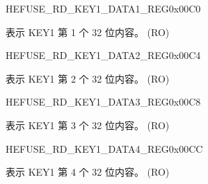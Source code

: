 \begin{register}{H}{EFUSE\_RD\_KEY1\_DATA1\_REG}{0x{}00C0}\label{regdesc:EFUSERDKEY1DATA1REG}
%
\regnewline%
\begin{regdesc}\begin{reglist}
\label{fielddesc:EFUSEKEY1DATA1}\item [EFUSE\_KEY1\_DATA1] 表示 KEY1 第 1 个 32 位内容。 (RO)
\end{reglist}\end{regdesc}
\end{register}


\begin{register}{H}{EFUSE\_RD\_KEY1\_DATA2\_REG}{0x{}00C4}\label{regdesc:EFUSERDKEY1DATA2REG}
%
\regnewline%
\begin{regdesc}\begin{reglist}
\label{fielddesc:EFUSEKEY1DATA2}\item [EFUSE\_KEY1\_DATA2] 表示 KEY1 第 2 个 32 位内容。 (RO)
\end{reglist}\end{regdesc}
\end{register}


\begin{register}{H}{EFUSE\_RD\_KEY1\_DATA3\_REG}{0x{}00C8}\label{regdesc:EFUSERDKEY1DATA3REG}
%
\regnewline%
\begin{regdesc}\begin{reglist}
\label{fielddesc:EFUSEKEY1DATA3}\item [EFUSE\_KEY1\_DATA3] 表示 KEY1 第 3 个 32 位内容。 (RO)
\end{reglist}\end{regdesc}
\end{register}


\begin{register}{H}{EFUSE\_RD\_KEY1\_DATA4\_REG}{0x{}00CC}\label{regdesc:EFUSERDKEY1DATA4REG}
%
\regnewline%
\begin{regdesc}\begin{reglist}
\label{fielddesc:EFUSEKEY1DATA4}\item [EFUSE\_KEY1\_DATA4] 表示 KEY1 第 4 个 32 位内容。 (RO)
\end{reglist}\end{regdesc}
\end{register}


